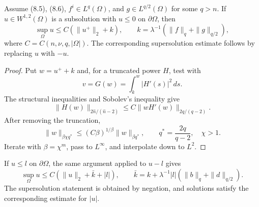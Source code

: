 \begin{theorem}
\label{gt-thm-8-15-global-boundedness}
Assume (8.5), (8.6), $f^i\in L^q(\Omega)$, and
$g\in L^{q/2}(\Omega)$ for some $q>n$. If
$u\in W^{1,2}(\Omega)$ is a subsolution with $u\leq0$ on $\partial\Omega$, then
\begin{equation}
\sup_\Omega u\leq C(\|u^+\|_2+k),
\qquad
k=\lambda^{-1}(\|f\|_q+\|g\|_{q/2}),
\tag{8.34}
\end{equation}
where $C=C(n,\nu,q,|\Omega|)$. The corresponding supersolution estimate follows
by replacing $u$ with $-u$.
\end{theorem}
\begin{proof}
\sketch Put $w=u^++k$ and, for a truncated power $H$, test with
\begin{equation}
\tag{8.35}
v=G(w)=\int_k^w|H'(s)|^2\,ds.
\end{equation}
The structural inequalities and Sobolev's inequality give
\begin{equation}
\tag{8.36}
\|H(w)\|_{2\widehat n/(\widehat n-2)}
\leq C\|wH'(w)\|_{2q/(q-2)}.
\end{equation}
After removing the truncation,
\begin{equation}
\tag{8.37}
\|w\|_{\beta\chi q^*}\leq(C\beta)^{1/\beta}\|w\|_{\beta q^*},
\qquad q^*=\frac{2q}{q-2},\quad \chi>1.
\end{equation}
Iterate with $\beta=\chi^m$, pass to $L^\infty$, and interpolate down to $L^2$.
\end{proof}

\begin{remark}
\label{gt-rem-8-constant-boundary-bound}
If $u\leq l$ on $\partial\Omega$, the same argument applied to $u-l$ gives
\begin{equation}
\sup_\Omega u\leq C(\|u\|_2+\bar k+|l|),
\qquad
\bar k=k+\lambda^{-1}|l|(\|b\|_q+\|d\|_{q/2}).
\tag{8.38}
\end{equation}
The supersolution statement is obtained by negation, and solutions satisfy the
corresponding estimate for $|u|$.
\end{remark}

